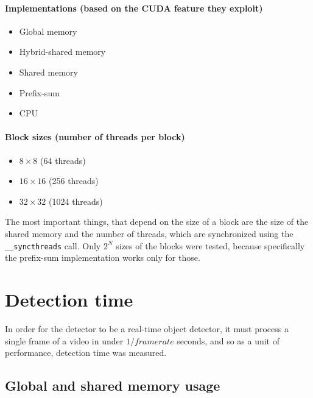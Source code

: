\paragraph{Implementations (based on the CUDA feature they exploit)}
\begin{itemize}
	\item Global memory
	\item Hybrid-shared memory
	\item Shared memory
	\item Prefix-sum
	\item CPU
\end{itemize}

\paragraph{Block sizes (number of threads per block)}
\begin{itemize}
	\item $8 \times 8$ (64 threads)
	\item $16 \times 16$ (256 threads)
	\item $32 \times 32$ (1024 threads)
\end{itemize}

The most important things, that depend on the size of a block are the size of the shared memory and the number of threads, which are synchronized using the \verb|__syncthreads| call. Only $2^N$ sizes of the blocks were tested, because specifically the prefix-sum implementation works only for those.

\section{Detection time}\label{sec:detection-time}

In order for the detector to be a real-time object detector, it must process a single frame of a video in under $1/framerate$ seconds, and so as a unit of performance, detection time was measured.

\subsection{Global and shared memory usage}
 
